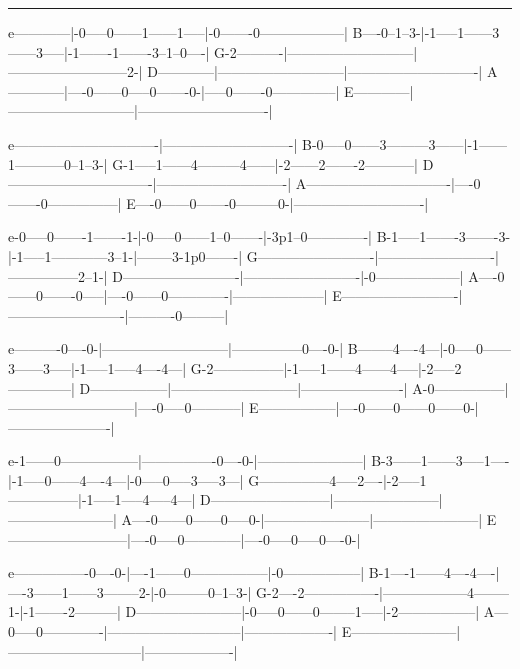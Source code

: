 \noindent\rule{\columnwidth}{1pt}

\begin{lsttab}
e------------|-0-----0------1------1-----|-0-------0------------------|
B----0--1--3-|-1-----1------3------3-----|-1-------1-------3--1--0----|
G-2----------|---------------------------|--------------------------2-|
D------------|---------------------------|----------------------------|
A------------|----0------0-----0-------0-|-----0-------0--------------|
E------------|---------------------------|----------------------------|

e-------------------------------|----------------------------|
B-0-----0------3---------3------|-1------1-----------0--1--3-|
G-1-----1------4---------4------|-2------2-------2-----------|
D-------------------------------|----------------------------|
A-------------------------------|----0-------0---------------|
E----0------0-------0---------0-|----------------------------|

e-0-----0-------1-------1-|-0-----0------1--0-------|-3p1--0-------------|
B-1-----1-------3-------3-|-1-----1------------3--1-|--------3-1p0-------|
G-------------------------|-------------------------|---------------2--1-|
D-------------------------|-------------------------|-0------------------|
A----0------0-------0-----|----0------0-------------|--------------------|
E-------------------------|-------------------------|----------0---------|

e----------0----0-|---------------------------|---------------0----0-|
B--------4----4---|-0-----0------3------3-----|-1-----1-----4----4---|
G-2---------------|-1-----1------4------4-----|-2-----2--------------|
D-----------------|---------------------------|----------------------|
A-0---------------|---------------------------|----0-----0-----------|
E-----------------|----0------0------0------0-|----------------------|

e-1------0-----------------|----------------0----0-|-----------------------|
B-3------1------3-----1----|-1-----0------4----4---|-0-----0-----3-----3---|
G---------------4-----2----|-2-----1---------------|-1-----1-----4-----4---|
D--------------------------|-----------------------|-----------------------|
A----0------0------0-----0-|-----------------------|-----------------------|
E--------------------------|----0-----0------------|----0-----0-----0----0-|

e----------------0----0-|----1------0-----------------|-0-----------------|
B-1----1------4----4----|----3------1------3--------2-|-0---------0--1--3-|
G-2----2----------------|------------------4--------1-|-1-------2---------|
D-----------------------|-0-----0------0--------1-----|-2-----------------|
A---0-----0-------------|-----------------------------|-------------------|
E-----------------------|-----------------------------|-------------------|


\end{lsttab}
